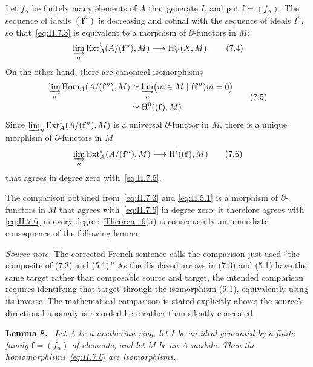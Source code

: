 \documentclass[11pt,a4paper,oneside]{book}
\providecommand{\ffam}{\mathbf f}
\providecommand{\Ext}{\operatorname{Ext}}
\newenvironment{sgastatement}[1]
  {\par\addvspace{0.8\baselineskip}\noindent\textbf{#1.}\ \itshape}
  {\par\addvspace{0.35\baselineskip}}
\theoremstyle{plain}
\theoremstyle{definition}
\theoremstyle{remark}
\begin{document}
Let $f_\alpha$ be finitely many elements of $A$ that generate $I$, and put
$\ffam=(f_\alpha)$. The sequence of ideals $(\ffam^n)$ is decreasing and
cofinal with the sequence of ideals $I^n$, so that~\eqref{eq:II.7.3} is
equivalent to a morphism of $\partial$-functors in $M$:
\begin{equation}
  \varinjlim_n\Ext_A^i(A/(\ffam^n),M)
  \longrightarrow \mathrm H_Y^i(X,M).
  \tag{7.4}\label{eq:II.7.4}
\end{equation}
On the other hand, there are canonical isomorphisms
\begin{equation}
\begin{split}
  \varinjlim_n\operatorname{Hom}_A(A/(\ffam^n),M)
  &\simeq \varinjlim_n
    \bigl(m\in M\mid(\ffam^n)m=0\bigr) \\
  &\simeq \mathrm H^0((\ffam),M).
\end{split}
  \tag{7.5}\label{eq:II.7.5}
\end{equation}
Since $\varinjlim_n\Ext_A^i(A/(\ffam^n),M)$ is a universal
$\partial$-functor in $M$, there is a unique morphism of $\partial$-functors
in $M$
\begin{equation}
  \varinjlim_n\Ext_A^i(A/(\ffam^n),M)
  \longrightarrow \mathrm H^i((\ffam),M)
  \tag{7.6}\label{eq:II.7.6}
\end{equation}
that agrees in degree zero with~\eqref{eq:II.7.5}.

The comparison obtained from~\eqref{eq:II.7.3} and
\eqref{eq:II.5.1} is a morphism of $\partial$-functors in $M$ that agrees
with~\eqref{eq:II.7.6} in degree zero; it therefore agrees with
\eqref{eq:II.7.6} in every degree. \hyperref[II.6]{Theorem~6}(a) is consequently an immediate
consequence of the following lemma.

\noindent\textit{Source note.} The corrected French sentence calls the
comparison just used ``the composite of (7.3) and (5.1).'' As the displayed
arrows in (7.3) and (5.1) have the same target rather than composable source
and target, the intended comparison requires identifying that target through
the isomorphism (5.1), equivalently using its inverse. The mathematical
comparison is stated explicitly above; the source's directional anomaly is
recorded here rather than silently concealed.

\begin{sgastatement}{Lemma 8}
Let $A$ be a noetherian ring, let $I$ be an ideal generated by a finite
family $\ffam=(f_\alpha)$ of elements, and let $M$ be an $A$-module. Then the
homomorphisms~\eqref{eq:II.7.6} are isomorphisms.
\end{sgastatement}
\end{document}
